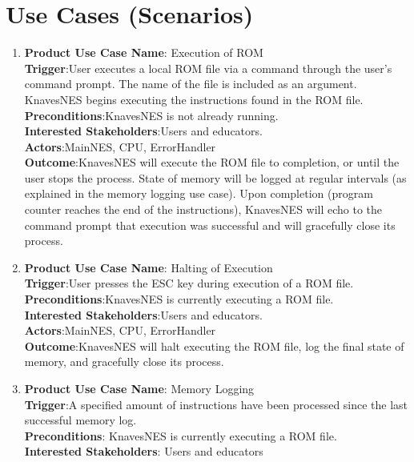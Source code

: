 \documentclass[12pt]{article}
\begin{document}
\section{Use Cases (Scenarios)}
	\begin{enumerate}
		\item \large{\textbf{Product Use Case Name}: Execution of ROM}\normalsize\\
			\textbf{Trigger}:User executes a local ROM file via a command through the user’s command prompt. The name of the file is included as an argument. KnavesNES begins executing the instructions found in the ROM file.\\
			\textbf{Preconditions}:KnavesNES is not already running.\\
			\textbf{Interested Stakeholders}:Users and educators.\\
			\textbf{Actors}:MainNES, CPU, ErrorHandler\\
			\textbf{Outcome}:KnavesNES will execute the ROM file to completion, or until the user stops the process. State of memory will be logged at regular intervals (as explained in the memory logging use case). Upon completion (program counter reaches the end of the instructions), KnavesNES will echo to the command prompt that execution was successful and will gracefully close its process. \\
		\item \large{\textbf{Product Use Case Name}: Halting of Execution}\normalsize\\
			\textbf{Trigger}:User presses the ESC key during execution of a ROM file.\\
			\textbf{Preconditions}:KnavesNES is currently executing a ROM file.\\
			\textbf{Interested Stakeholders}:Users and educators.\\
			\textbf{Actors}:MainNES, CPU, ErrorHandler\\
			\textbf{Outcome}:KnavesNES will halt executing the ROM file, log the final state of memory, and gracefully close its process.\\
		\item \large{\textbf{Product Use Case Name}: Memory Logging}\normalsize\\
			\textbf{Trigger}:A specified amount of instructions have been processed since the last successful memory log.\\
			\textbf{Preconditions}: KnavesNES is currently executing a ROM file.\\
			\textbf{Interested Stakeholders}: Users and educators\\

\end{enumerate}
\end{document}
